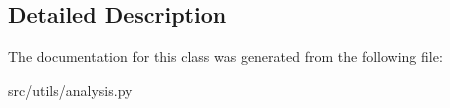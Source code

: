 \subsection{Detailed Description}
\begin{DoxyVerb}\end{DoxyVerb}
 

The documentation for this class was generated from the following file\+:\begin{DoxyCompactItemize}
\item 
src/utils/analysis.\+py\end{DoxyCompactItemize}
